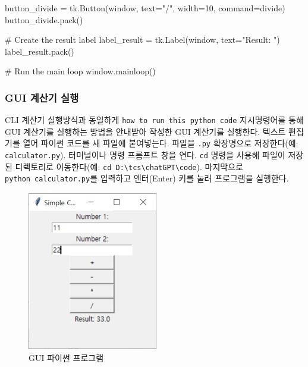 \documentclass[
  letterpaper,
]{book}
\newenvironment{Shaded}{\begin{snugshade}}{\end{snugshade}}
\newcommand{\CommentTok}[1]{\textcolor[rgb]{0.37,0.37,0.37}{#1}}
\newcommand{\DecValTok}[1]{\textcolor[rgb]{0.68,0.00,0.00}{#1}}
\newcommand{\NormalTok}[1]{\textcolor[rgb]{0.00,0.23,0.31}{#1}}
\newcommand{\OperatorTok}[1]{\textcolor[rgb]{0.37,0.37,0.37}{#1}}
\newcommand{\StringTok}[1]{\textcolor[rgb]{0.13,0.47,0.30}{#1}}
\begin{document}
\begin{Shaded}
\begin{Highlighting}[]
\NormalTok{button\_divide }\OperatorTok{=}\NormalTok{ tk.Button(window, text}\OperatorTok{=}\StringTok{"/"}\NormalTok{, width}\OperatorTok{=}\DecValTok{10}\NormalTok{, command}\OperatorTok{=}\NormalTok{divide)}
\NormalTok{button\_divide.pack()}

\CommentTok{\# Create the result label}
\NormalTok{label\_result }\OperatorTok{=}\NormalTok{ tk.Label(window, text}\OperatorTok{=}\StringTok{"Result: "}\NormalTok{)}
\NormalTok{label\_result.pack()}

\CommentTok{\# Run the main loop}
\NormalTok{window.mainloop()}
\end{Highlighting}
\end{Shaded}

\hypertarget{gui-uxacc4uxc0b0uxae30-uxc2e4uxd589}{%
\subsubsection{GUI 계산기
실행}\label{gui-uxacc4uxc0b0uxae30-uxc2e4uxd589}}

CLI 계산기 실행방식과 동일하게 \texttt{how\ to\ run\ this\ python\ code}
지시명령어를 통해 GUI 계산기를 실행하는 방법을 안내받아 작성한 GUI
계산기를 실행한다. 텍스트 편집기를 열어 파이썬 코드를 새 파일에
붙여넣는다. 파일을 \texttt{.py} 확장명으로 저장한다(예:
\texttt{calculator.py}). 터미널이나 명령 프롬프트 창을 연다. \texttt{cd}
명령을 사용해 파일이 저장된 디렉토리로 이동한다(예:
\texttt{cd\ D:\textbackslash{}tcs\textbackslash{}chatGPT\textbackslash{}code}).
마지막으로 \texttt{python\ calculator.py}를 입력하고 엔터(Enter) 키를
눌러 프로그램을 실행한다.

\begin{figure}

{\centering \includegraphics{images/calculator_gui.jpg}

}

\caption{GUI 파이썬 프로그램}

\end{figure}
\end{document}
